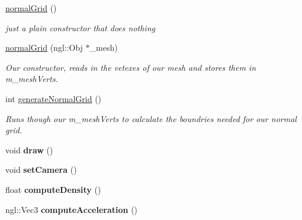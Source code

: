 \begin{DoxyCompactItemize}
\item 
\hypertarget{classnormalGrid_acec9a4163f707d22e8c1c1a9e37ca174}{\hyperlink{classnormalGrid_acec9a4163f707d22e8c1c1a9e37ca174}{normal\-Grid} ()}\label{classnormalGrid_acec9a4163f707d22e8c1c1a9e37ca174}

\begin{DoxyCompactList}\small\item\em just a plain constructor that does nothing \end{DoxyCompactList}\item 
\hypertarget{classnormalGrid_a12824a3734b701ecd9320e75d56dce85}{\hyperlink{classnormalGrid_a12824a3734b701ecd9320e75d56dce85}{normal\-Grid} (ngl\-::\-Obj $\ast$\-\_\-mesh)}\label{classnormalGrid_a12824a3734b701ecd9320e75d56dce85}

\begin{DoxyCompactList}\small\item\em Our constructor, reads in the vetexes of our mesh and stores them in m\-\_\-mesh\-Verts. \end{DoxyCompactList}\item 
\hypertarget{classnormalGrid_a001cf6afb203cc6b3f24c55f696d70ee}{int \hyperlink{classnormalGrid_a001cf6afb203cc6b3f24c55f696d70ee}{generate\-Normal\-Grid} ()}\label{classnormalGrid_a001cf6afb203cc6b3f24c55f696d70ee}

\begin{DoxyCompactList}\small\item\em Runs though our m\-\_\-mesh\-Verts to calculate the boundries needed for our normal grid. \end{DoxyCompactList}\item 
\hypertarget{classnormalGrid_a08bd874baca9e042f87fcf8f27c65c1e}{void {\bfseries draw} ()}\label{classnormalGrid_a08bd874baca9e042f87fcf8f27c65c1e}

\item 
\hypertarget{classnormalGrid_a654b3464deb8400d1857f63740e77802}{void {\bfseries set\-Camera} ()}\label{classnormalGrid_a654b3464deb8400d1857f63740e77802}

\item 
\hypertarget{classnormalGrid_ac9b16e619d790530be9df6fa5856680a}{float {\bfseries compute\-Density} ()}\label{classnormalGrid_ac9b16e619d790530be9df6fa5856680a}

\item 
\hypertarget{classnormalGrid_a1bb0a1d725d57b1d44fd2938928219ca}{ngl\-::\-Vec3 {\bfseries compute\-Acceleration} ()}\label{classnormalGrid_a1bb0a1d725d57b1d44fd2938928219ca}


\end{DoxyCompactItemize}
